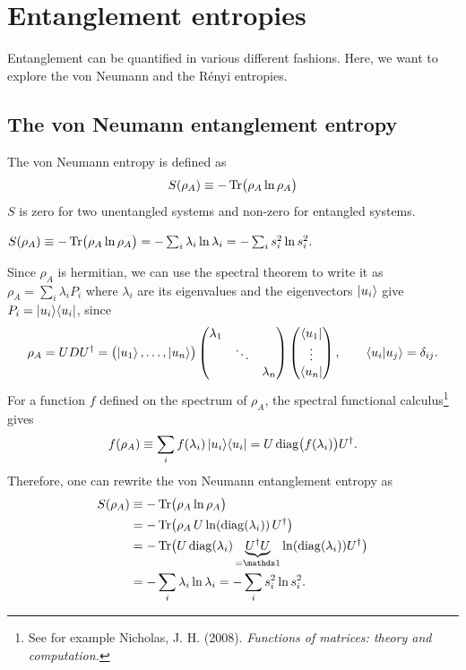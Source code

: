 \documentclass[../../main.tex]{subfiles}
\begin{document}
\section{Entanglement entropies}
\label{sec:entanglement-entropies}

Entanglement can be quantified in various different fashions. Here, we want to explore the von Neumann and the Rényi entropies.

\subsection{The von Neumann entanglement entropy}
The von Neumann entropy is defined as
\begin{equation}
      S(\rho_A)\equiv-\operatorname{Tr}\bigl(\rho_A\ln\rho_A\bigr)
\end{equation}
$S$ is zero for two unentangled systems and non-zero for entangled systems.
\begin{claim}
      $S(\rho_A)\equiv-\operatorname{Tr}\bigl(\rho_A\ln\rho_A\bigr) = -\sum_i\lambda_i\ln\lambda_i =-\sum_i s_i^2\ln s_i^2.$
\end{claim}
\begin{claimproof}
      Since $\rho_A$ is hermitian, we can use the spectral theorem to write it as
      $\rho_A=\sum_i\lambda_i P_i$ where $\lambda_i$ are its eigenvalues and the eigenvectors
      $\left\lvert u_i \right\rangle$ give $P_i=\left\lvert u_i \right\rangle\!\left\langle u_i \right\rvert$, since
      \begin{equation}
      \rho_A=UDU^\dagger=\bigl(\left\lvert u_1 \right\rangle,\dots,\left\lvert u_n \right\rangle\bigr)
      \begin{pmatrix}\lambda_1& &\\ &\ddots&\\ & &\lambda_n\end{pmatrix}
      \begin{pmatrix}\left\langle u_1 \right\rvert\\\vdots\\\left\langle u_n \right\rvert\end{pmatrix},
      \qquad\left\langle u_i \middle| u_j \right\rangle=\delta_{ij}.
      \end{equation}
      For a function $f$ defined on the spectrum of $\rho_A$, the spectral
      functional calculus\footnote{See for example Nicholas, J. H. (2008). \emph{Functions of matrices: theory and computation.}} gives
      \begin{equation}
      f(\rho_A)\equiv\sum_i f(\lambda_i)\left\lvert u_i \right\rangle\!\left\langle u_i \right\rvert
      =U\operatorname{diag}\bigl(f(\lambda_i)\bigr)U^\dagger.
      \end{equation}
      Therefore, one can rewrite the von Neumann entanglement entropy as
      \begin{align}
      S(\rho_A)&\equiv-\Tr\bigl(\rho_A\ln\rho_A\bigr) \\
      &=-\Tr\bigl(\rho_A\,U\ln(\diag(\lambda_i))\,U^\dagger\bigr)\notag\\
      &=-\Tr\bigl(U\diag(\lambda_i)\underbrace{U^\dagger U}_{=\mathds 1}\ln(\diag(\lambda_i))U^\dagger\bigr)\notag\\
      &=-\sum_i\lambda_i\ln\lambda_i
      =-\sum_i s_i^2\ln s_i^2.
      \end{align}
\end{claimproof}
\end{document}

